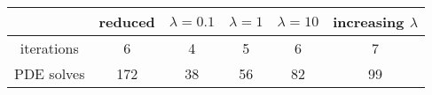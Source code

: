 \begin{tabular}{cccccc}
& reduced & $\lambda = 0.1$ & $\lambda = 1$ & $\lambda = 10$ & increasing $\lambda$ \\
\hline
iterations & 6 & 4 & 5 & 6 & 7 \\
PDE solves & 172 & 38 & 56 & 82 & 99 \\
\hline
\end{tabular}
